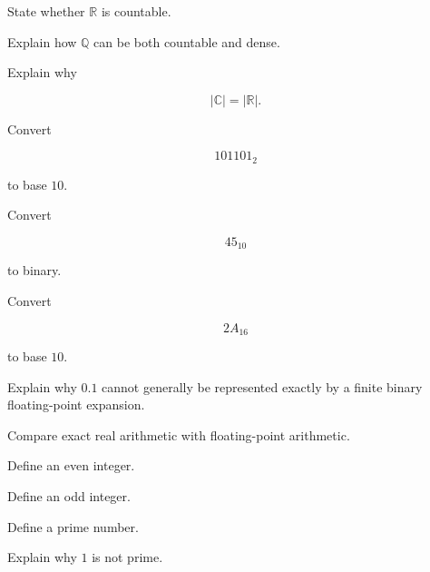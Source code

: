 \begin{exercise}[2]
State whether \(\mathbb{R}\) is countable.
\end{exercise}

\begin{exercise}[3]
Explain how \(\mathbb{Q}\) can be both countable and dense.
\end{exercise}

\begin{exercise}[3]
Explain why

\[
|\mathbb{C}|=|\mathbb{R}|.
\]
\end{exercise}

\begin{exercise}[2]
Convert

\[
101101_2
\]

to base \(10\).
\end{exercise}

\begin{exercise}[2]
Convert

\[
45_{10}
\]

to binary.
\end{exercise}

\begin{exercise}[2]
Convert

\[
2A_{16}
\]

to base \(10\).
\end{exercise}

\begin{exercise}[3]
Explain why \(0.1\) cannot generally be represented exactly by a finite
binary floating-point expansion.
\end{exercise}

\begin{exercise}[3]
Compare exact real arithmetic with floating-point arithmetic.
\end{exercise}

\begin{exercise}[2]
Define an even integer.
\end{exercise}

\begin{exercise}[2]
Define an odd integer.
\end{exercise}

\begin{exercise}[2]
Define a prime number.
\end{exercise}

\begin{exercise}[2]
Explain why \(1\) is not prime.
\end{exercise}

